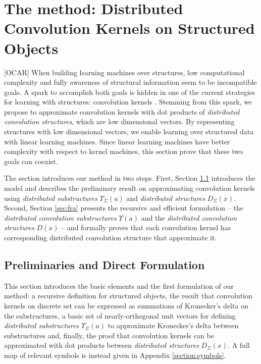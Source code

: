 \documentclass[twoside,11pt]{article}
\def\df{\Upsilon}
\def\OCAR#1#2#3#4{[{\color{blue}O}{\color{brown}C}{\color{black}A}{\color{purple}R}] {\color{blue}#1} {\color{brown}#2} {\color{black}#3} {\color{purple}#4}}
\begin{document}
\section{The method: Distributed Convolution Kernels on Structured Objects}
\label{sec:method}


\OCAR{When building learning machines over structures,}{ low computational complexity and fully awareness of structural information seem to be incompatible goals.}{A spark to accomplish both goals
is hidden in one of the current strategies for learning with structures: convolution kernels \cite{Haussler99convolutionkernels}. Stemming from this spark, we propose to approximate convolution kernels with dot products of \emph{distributed convolution structures}, which are low dimensional vectors.}{By representing structures with low dimensional vectors, we enable learning over structured data with linear learning machines. Since linear learning machines have better complexity with respect to kernel machines, this section prove that these two goals can coexist.}


The section introduces our method in two steps. First, Section \ref{sec:preliminaries_DF} introduces the model and describes the preliminary result on approximating convolution kernels using \emph{distributed substructures} $\df_{\Sigma}(a)$ and \emph{distributed structures} $D_{\Sigma}(x)$. Second, Section \ref{sec:fra} presents the recursive and efficient formulation --  the \emph{distributed convolution substructures} $\df(a)$ and the \emph{distributed convolution structures} $D(x)$ -- and formally proves that each convolution kernel has corresponding distributed convolution structure that approximate it.


\subsection{Preliminaries and Direct Formulation}
\label{sec:preliminaries_DF}

This section introduces the basic elements and the first formulation of  our method: a recursive definition for structured objects, the result that convolution kernels on discrete set can be expressed as summations of Kronecker's delta on the substructures, a basic set of nearly-orthogonal unit vectors for defining \emph{distributed substructures} $\df_{\Sigma}(a)$ to approximate Kronecker's delta between substructures and, finally, the proof that convolution kernels can be approximated with dot products between \emph{distributed structures} $D_{\Sigma}(x)$. A full map of relevant symbols is instead given in Appendix \ref{section:symbols}. 
\end{document}
